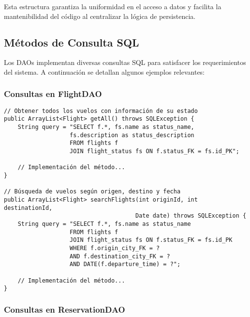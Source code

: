 \documentclass[12pt,a4paper]{article}
\begin{document}
Esta estructura garantiza la uniformidad en el acceso a datos y facilita la mantenibilidad del código al centralizar la lógica de persistencia.

\subsection{Métodos de Consulta SQL}

Los DAOs implementan diversas consultas SQL para satisfacer los requerimientos del sistema. A continuación se detallan algunos ejemplos relevantes:

\subsubsection{Consultas en FlightDAO}

\begin{verbatim}
// Obtener todos los vuelos con información de su estado
public ArrayList<Flight> getAll() throws SQLException {
    String query = "SELECT f.*, fs.name as status_name,
                   fs.description as status_description
                   FROM flights f
                   JOIN flight_status fs ON f.status_FK = fs.id_PK";

    // Implementación del método...
}

// Búsqueda de vuelos según origen, destino y fecha
public ArrayList<Flight> searchFlights(int originId, int destinationId,
                                      Date date) throws SQLException {
    String query = "SELECT f.*, fs.name as status_name
                   FROM flights f
                   JOIN flight_status fs ON f.status_FK = fs.id_PK
                   WHERE f.origin_city_FK = ?
                   AND f.destination_city_FK = ?
                   AND DATE(f.departure_time) = ?";

    // Implementación del método...
}
\end{verbatim}

\subsubsection{Consultas en ReservationDAO}
\end{document}
